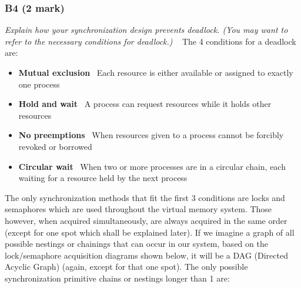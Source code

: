 \documentclass{report}
\newcommand{\question}[1]{\textit{#1} \ }
\newcommand{\bullpara}[2]{\item \textbf{#1} \ #2}
\newcommand{\compitem}[1]{\begin{itemize}\setlength\itemsep{-0.1em}#1\end{itemize}}
\begin{document}
			\subsubsection*{B4 (2 mark)}
				\question{Explain how your synchronization design prevents deadlock.
				(You may want to refer to the necessary conditions for deadlock.)}
				The 4 conditions for a deadlock are:
				\compitem{
					\bullpara{Mutual exclusion}{Each resource is either available or assigned to exactly one process}
					\bullpara{Hold and wait}{A process can request resources while it holds other resources}
					\bullpara{No preemptions}{When resources given to a process cannot be forcibly revoked or borrowed}
					\bullpara{Circular wait}{When two or more processes are in a circular chain, each waiting for a resource held by the next process}
				}
				The only synchronization methods that fit the first 3 conditions are locks and semaphores which are used throughout the virtual memory system.
				Those however, when acquired simultaneously, are always acquired in the same order (except for one spot which shall be explained later). 
				If we imagine a graph of all possible nestings or chainings that can occur in our system, based on the lock/semaphore acquisition diagrams shown below, 
				it will be a DAG (Directed Acyclic Graph) (again, except for that one spot). The only possible synchronization primitive chains or nestings longer than 1 are:
\end{document}
